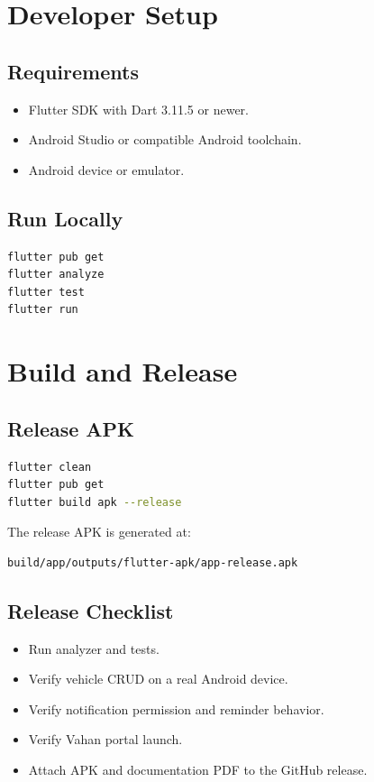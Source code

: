 \documentclass[11pt,a4paper]{article}
\begin{document}
\section{Developer Setup}

\subsection{Requirements}
\begin{itemize}[leftmargin=*]
  \item Flutter SDK with Dart 3.11.5 or newer.
  \item Android Studio or compatible Android toolchain.
  \item Android device or emulator.
\end{itemize}

\subsection{Run Locally}
\begin{lstlisting}[language=bash]
flutter pub get
flutter analyze
flutter test
flutter run
\end{lstlisting}

\section{Build and Release}

\subsection{Release APK}
\begin{lstlisting}[language=bash]
flutter clean
flutter pub get
flutter build apk --release
\end{lstlisting}

The release APK is generated at:
\begin{lstlisting}
build/app/outputs/flutter-apk/app-release.apk
\end{lstlisting}

\subsection{Release Checklist}
\begin{itemize}[leftmargin=*]
  \item Run analyzer and tests.
  \item Verify vehicle CRUD on a real Android device.
  \item Verify notification permission and reminder behavior.
  \item Verify Vahan portal launch.
  \item Attach APK and documentation PDF to the GitHub release.
\end{itemize}
\end{document}
